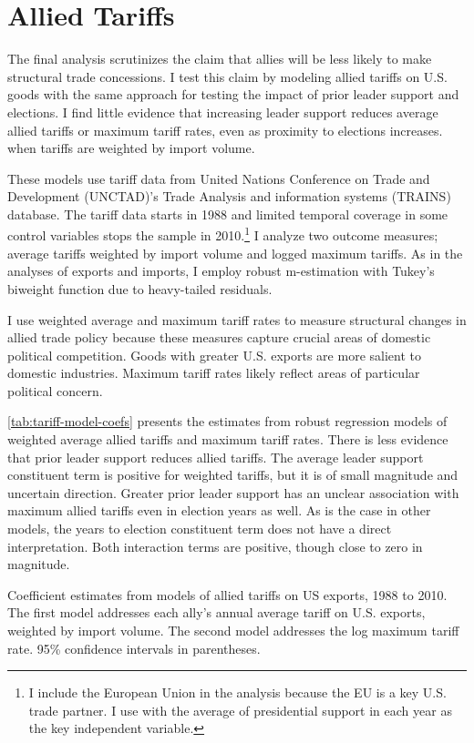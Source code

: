 \documentclass[12pt]{article}
\begin{document}
\section{Allied Tariffs} 


The final analysis scrutinizes the claim that allies will be less likely to make structural trade concessions. 
I test this claim by modeling allied tariffs on U.S. goods with the same approach for testing the impact of prior leader support and elections. 
I find little evidence that increasing leader support reduces average allied tariffs or maximum tariff rates, even as proximity to elections increases. when tariffs are weighted by import volume. 


These models use tariff data from United Nations Conference on Trade and Development (UNCTAD)'s Trade Analysis and information systems (TRAINS) database. 
The tariff data starts in 1988 and limited temporal coverage in some control variables stops the sample in 2010.\footnote{I include the European Union in the analysis because the EU is a key U.S. trade partner. I use with the average of presidential support in each year as the key independent variable.}
I analyze two outcome measures; average tariffs weighted by import volume and logged maximum tariffs. 
As in the analyses of exports and imports, I employ robust m-estimation with Tukey's biweight function due to heavy-tailed residuals.

I use weighted average and maximum tariff rates to measure structural changes in allied trade policy because these measures capture crucial areas of domestic political competition.
Goods with greater U.S. exports are more salient to domestic industries. 
Maximum tariff rates likely reflect areas of particular political concern.


\autoref{tab:tariff-model-coefs} presents the estimates from robust regression models of weighted average allied tariffs and maximum tariff rates. 
There is less evidence that prior leader support reduces allied tariffs. 
The average leader support constituent term is positive for weighted tariffs, but it is of small magnitude and uncertain direction.
Greater prior leader support has an unclear association with maximum allied tariffs even in election years as well.
As is the case in other models, the years to election constituent term does not have a direct interpretation.
Both interaction terms are positive, though close to zero in magnitude. 


\begin{table}
\centering

	\caption{Coefficient estimates from models of allied tariffs on US exports, 1988 to 2010. The first model addresses each ally's annual average tariff on U.S. exports, weighted by import volume. The second model addresses the log maximum tariff rate. 95\% confidence intervals in parentheses.}
	\label{tab:tariff-model-coefs}
\end{table}
\end{document}
